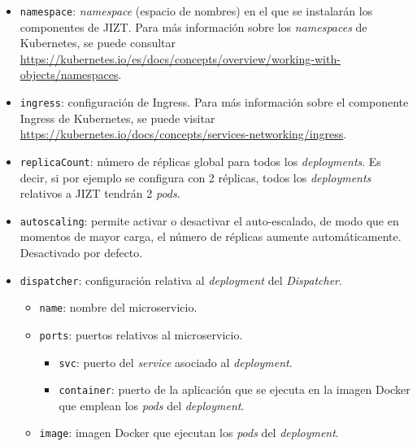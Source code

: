 \vspace{-0.3cm}
\begin{itemize} [\textbullet]
	\item \texttt{namespace}: \emph{namespace} (espacio de nombres) en el que se instalarán los componentes de JIZT. Para más información sobre los \emph{namespaces} de Kubernetes, se puede consultar \href{https://kubernetes.io/es/docs/concepts/overview/working-with-objects/namespaces}{https://kubernetes.io/es/docs/concepts/\newline overview/working-with-objects/namespaces}.
	
	\item \texttt{ingress}: configuración de Ingress. Para más información sobre el componente Ingress de Kubernetes, se puede visitar \href{https://kubernetes.io/docs/concepts/services-networking/ingress}{https://kubernetes.io/\newline docs/concepts/services-networking/ingress}.
	
	\item \texttt{replicaCount}: número de réplicas global para todos los \emph{deployments}. Es decir, si por ejemplo se configura con 2 réplicas, todos los \emph{deployments} relativos a JIZT tendrán 2 \emph{pods}.
	
	\item \texttt{autoscaling}: permite activar o desactivar el auto-escalado, de modo que en momentos de mayor carga, el número de réplicas aumente automáticamente. Desactivado por defecto.
	
	\item \texttt{dispatcher}: configuración relativa al \emph{deployment} del \emph{Dispatcher}.
	\begin{itemize} [◦]
		\item \texttt{name}: nombre del microservicio.
		\item \texttt{ports}: puertos relativos al microservicio.
		\begin{itemize} [-]
			\item \texttt{svc}: puerto del \emph{service} asociado al \emph{deployment}.
			\item \texttt{container}: puerto de la aplicación que se ejecuta en la imagen Docker que emplean los \emph{pods} del \emph{deployment}.
		\end{itemize}
		\item \texttt{image}: imagen Docker que ejecutan los \emph{pods} del \emph{deployment}.
	\end{itemize}


\end{itemize}
